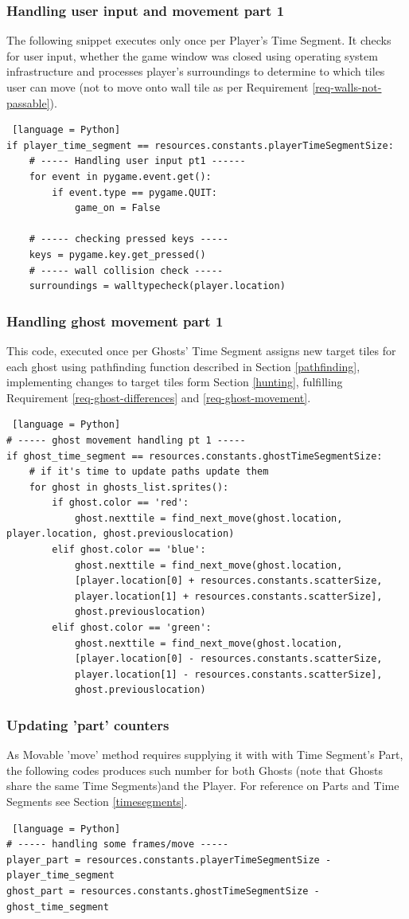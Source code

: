 \documentclass[11pt,a4paper]{report}
\begin{document}
				\subsubsection{Handling user input and movement part 1}
					The following snippet executes only once per Player's Time Segment. It checks for user input, whether the game window was closed using operating system infrastructure and processes player's surroundings to determine to which tiles user can move (not to move onto wall tile as per Requirement \ref{req-walls-not-passable}).
					\begin{lstlisting} [language = Python]
if player_time_segment == resources.constants.playerTimeSegmentSize:
	# ----- Handling user input pt1 ------
	for event in pygame.event.get():
		if event.type == pygame.QUIT:
			game_on = False

	# ----- checking pressed keys -----
	keys = pygame.key.get_pressed()
	# ----- wall collision check -----
	surroundings = walltypecheck(player.location)
					\end{lstlisting}
				\subsubsection{Handling ghost movement part 1}
					This code, executed once per Ghosts' Time Segment assigns new target tiles for each ghost using pathfinding function described in Section \ref{pathfinding}, implementing changes to target tiles form Section \ref{hunting}, fulfilling Requirement \ref{req-ghost-differences} and \ref{req-ghost-movement}.
					\begin{lstlisting} [language = Python]
# ----- ghost movement handling pt 1 -----
if ghost_time_segment == resources.constants.ghostTimeSegmentSize:
	# if it's time to update paths update them
	for ghost in ghosts_list.sprites():
		if ghost.color == 'red':
			ghost.nexttile = find_next_move(ghost.location, player.location, ghost.previouslocation)
		elif ghost.color == 'blue':
			ghost.nexttile = find_next_move(ghost.location,
			[player.location[0] + resources.constants.scatterSize,
			player.location[1] + resources.constants.scatterSize],
			ghost.previouslocation)
		elif ghost.color == 'green':
			ghost.nexttile = find_next_move(ghost.location,
			[player.location[0] - resources.constants.scatterSize,
			player.location[1] - resources.constants.scatterSize],
			ghost.previouslocation)
					\end{lstlisting}
				\subsubsection{Updating 'part' counters}
					As Movable 'move' method requires supplying it with with Time Segment's Part, the following codes produces such number for both Ghosts (note that Ghosts share the same Time Segments)and the Player. For reference on Parts and Time Segments see Section \ref{timesegments}.
					\begin{lstlisting} [language = Python]
# ----- handling some frames/move -----
player_part = resources.constants.playerTimeSegmentSize - player_time_segment
ghost_part = resources.constants.ghostTimeSegmentSize - ghost_time_segment
					\end{lstlisting}
\end{document}
